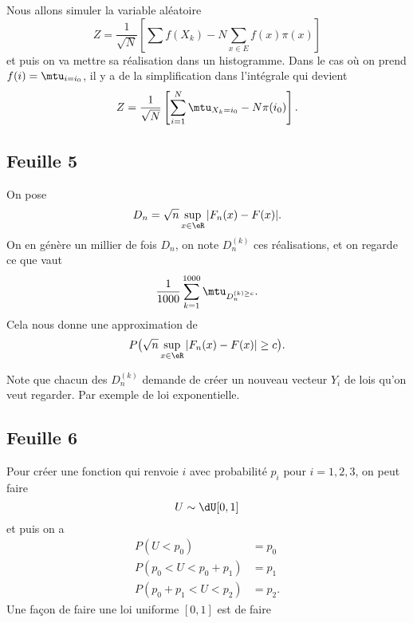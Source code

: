 Nous allons simuler la variable aléatoire
\begin{equation}
	Z=\frac{1}{ \sqrt{N} }\left[ \sum f(X_k)-N\sum_{x\in E} f(x)\pi(x) \right]
\end{equation}
et puis on va mettre sa réalisation dans un histogramme. Dans le cas où on prend \( f(i)=\mtu_{i=i_0}\), il y a de la simplification dans l'intégrale qui devient
\begin{equation}
	Z=\frac{1}{ \sqrt{N} }\left[ \sum_{i=1}^N\mtu_{X_k=i_0}-N\pi(i_0) \right].
\end{equation}

\subsection{Feuille 5}

On pose
\begin{equation}
	D_n=\sqrt{n}\sup_{x\in\eR}| F_n(x)-F(x) |.
\end{equation}
On en génère un millier de fois \( D_n\), on note \( D_n^{(k)}\) ces réalisations, et on regarde ce que vaut
\begin{equation}
	\frac{1}{ 1000 }\sum_{k=1}^{1000}\mtu_{D_n^{(k)\geq c}}.
\end{equation}
Cela nous donne une approximation de
\begin{equation}
	P\big( \sqrt{n}\sup_{x\in\eR}| F_n(x)-F(x) |\geq c \big).
\end{equation}

Note que chacun des \( D_n^{(k)}\) demande de créer un nouveau vecteur \( Y_i\) de lois qu'on veut regarder. Par exemple de loi exponentielle.

\subsection{Feuille 6}

Pour créer une fonction qui renvoie \( i\) avec probabilité \( p_i\) pour \( i=1,2,3\), on peut faire
\begin{equation}
	U\sim\dU[0,1]
\end{equation}
et puis on a
\begin{subequations}
	\begin{align}
		P(U<p_0)         & =p_0  \\
		P(p_0<U<p_0+p_1) & =p_1  \\
		P(p_0+p_1<U<p_2) & =p_2.
	\end{align}
\end{subequations}
Une façon de faire une loi uniforme \( [0,1]\) est de faire 

